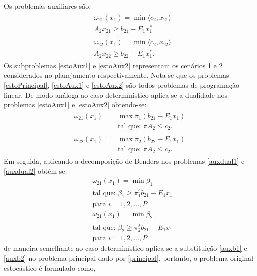 Os problemas auxiliares s\~ao:
\begin{align}
	\label{estoAux1}
  \begin{split}	
  	&\omega_{21}(x_1) =\min \langle c_2,x_{21}\rangle \\
  	& A_2 x_{21} \geq b_{21} - E_1 x_1^{*} 
  \end{split}
\end{align}
\begin{align}
	\label{estoAux2}
	\begin{split}	
 		&\omega_{22}(x_1) = \min  \langle c_2,x_{22}\rangle \\
		&A_2x_{22} \geq b_{22} - E_1 x_1^{*}. 
	\end{split}
\end{align}
Os subproblemas \ref{estoAux1} e \ref{estoAux2} representam os cen\'arios 1 e 2 considerados no planejamento respectivamente.
Nota-se que os problemas  \ref{estoPrincipal}, \ref{estoAux1} e \ref{estoAux2} s\~ao todos problemas de programa\c c\~ao
linear. De modo an\'aloga ao caso determ\'inistico aplica-se a dualidade nos problemas \ref{estoAux1} e \ref{estoAux2}
obtendo-se:
\begin{align}
  \begin{split}	
	  \omega_{21}(x_1) = &\max \pi_1 (b_{21} - E_1x_1 ) \\
	&\mbox{tal que: }\pi A_2  \leq c_2.
  \end{split}
 	\label{auxdual1}
\end{align}
\begin{align}
  \begin{split}	
	  \omega_{22}(x_1) = &\max \pi_2 (b_{22} - E_1x_1 ) \\
	&\mbox{tal que: }\pi A_2  \leq c_2.
  \end{split}
 	\label{auxdual2}
\end{align}
Em seguida, aplicando a decomposi\c c\~ao de Benders nos problemas \ref{auxdual1} e \ref{auxdual2} obt\^em-se:  
\begin{align}
	\label{auxb1}
&\omega_{21}(x_1) = \min  \beta_{1}\nonumber \\
	&\mbox{tal que: }\beta_{1}  \geq {\pi}_{1}^{i}b_{21} - E_1 x_1 \\
	&\mbox{para }i = 1,2,\dots, P  \nonumber
  \end{align}
\begin{align}
	\label{auxb2}
&\omega_{21}(x_1) = \min  \beta_{2}\nonumber \\
	&\mbox{tal que: }\beta_{2}  \geq {\pi}_{2}^{j}b_{21} - E_1 x_1 \\
	&\mbox{para }i = 1,2,\dots, P  \nonumber
  \end{align}
 de maneira semelhante ao caso determin\'istico aplica-se a substitui\c c\~ao \ref{auxb1} e \ref{auxb2} no problema
 principal  dado por \ref{principal}, portanto, o problema original estoc\'astico \'e formulado como,

